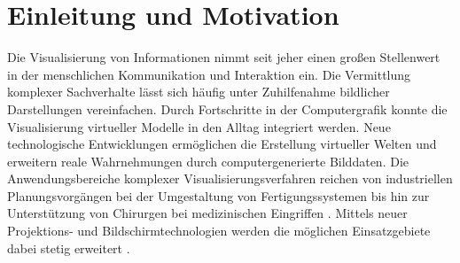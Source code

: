 \chapter{Einleitung und Motivation}


Die Visualisierung von Informationen nimmt seit jeher einen großen Stellenwert in der menschlichen Kommunikation und Interaktion ein. Die Vermittlung komplexer Sachverhalte lässt sich häufig unter Zuhilfenahme bildlicher Darstellungen vereinfachen. Durch Fortschritte in der Computergrafik konnte die Visualisierung virtueller Modelle in den Alltag integriert werden. Neue technologische Entwicklungen ermöglichen die Erstellung virtueller Welten und erweitern reale Wahrnehmungen durch computergenerierte Bilddaten. Die Anwendungsbereiche komplexer Visualisierungsverfahren reichen von industriellen Planungsvorgängen bei der Umgestaltung von Fertigungssystemen \cite{Lindskog2013} bis hin zur Unterstützung von Chirurgen bei medizinischen Eingriffen \cite{Kersten2013}. Mittels neuer Projektions- und Bildschirmtechnologien werden die möglichen Einsatzgebiete dabei stetig erweitert \cite{Carmigniani2011}.\\

